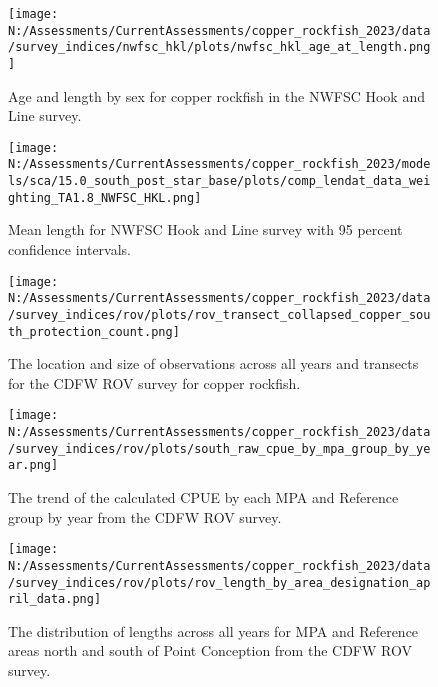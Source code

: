 \documentclass[11pt,
  english,
  letterpaper,
]{article}
\begin{document}
\pagebreak

\begin{figure}
\centering
\texttt{[image: N:/Assessments/CurrentAssessments/copper\_rockfish\_2023/data/survey\_indices/nwfsc\_hkl/plots/nwfsc\_hkl\_age\_at\_length.png]}
\caption{Age and length by sex for copper rockfish in the NWFSC Hook and Line survey.\label{fig:nwfsc-hkl-len-age}}
\end{figure}

\pagebreak

\begin{figure}
\centering
\texttt{[image: N:/Assessments/CurrentAssessments/copper\_rockfish\_2023/models/sca/15.0\_south\_post\_star\_base/plots/comp\_lendat\_data\_weighting\_TA1.8\_NWFSC\_HKL.png]}
\caption{Mean length for NWFSC Hook and Line survey with 95 percent confidence intervals.\label{fig:mean-hkl-len-data}}
\end{figure}

\pagebreak

\begin{figure}
\centering
\texttt{[image: N:/Assessments/CurrentAssessments/copper\_rockfish\_2023/data/survey\_indices/rov/plots/rov\_transect\_collapsed\_copper\_south\_protection\_count.png]}
\caption{The location and size of observations across all years and transects for the CDFW ROV survey for copper rockfish.\label{fig:rov-obs-loc}}
\end{figure}

\pagebreak

\begin{figure}
\centering
\texttt{[image: N:/Assessments/CurrentAssessments/copper\_rockfish\_2023/data/survey\_indices/rov/plots/south\_raw\_cpue\_by\_mpa\_group\_by\_year.png]}
\caption{The trend of the calculated CPUE by each MPA and Reference group by year from the CDFW ROV survey.\label{fig:rov-raw-cpue}}
\end{figure}

\pagebreak

\begin{figure}
\centering
\texttt{[image: N:/Assessments/CurrentAssessments/copper\_rockfish\_2023/data/survey\_indices/rov/plots/rov\_length\_by\_area\_designation\_april\_data.png]}
\caption{The distribution of lengths across all years for MPA and Reference areas north and south of Point Conception from the CDFW ROV survey.\label{fig:rov-len}}
\end{figure}
\end{document}
